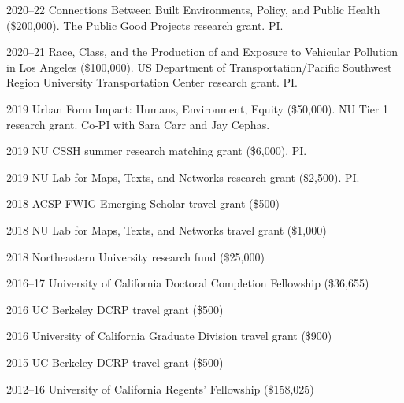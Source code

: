 \documentclass[12pt,letterpaper]{report}
\begin{document}
    \begin{tablist}

        \item[2020--22] \tab Connections Between Built Environments, Policy, and Public Health (\$200,000). The Public Good Projects research grant. PI.

        \item[2020--21] \tab Race, Class, and the Production of and Exposure to Vehicular Pollution in Los Angeles (\$100,000). US Department of Transportation/Pacific Southwest Region University Transportation Center research grant. PI.

        \item[2019] \tab Urban Form Impact: Humans, Environment, Equity (\$50,000). NU Tier 1 research grant. Co-PI with Sara Carr and Jay Cephas.

        \item[2019] \tab NU CSSH summer research matching grant (\$6,000). PI.

        \item[2019] \tab NU Lab for Maps, Texts, and Networks research grant (\$2,500). PI.

        \item[2018] \tab ACSP FWIG Emerging Scholar travel grant (\$500)

        \item[2018] \tab NU Lab for Maps, Texts, and Networks travel grant (\$1,000)

        \item[2018] \tab Northeastern University research fund (\$25,000)

        \item[2016--17] \tab University of California Doctoral Completion Fellowship (\$36,655)

        \item[2016] \tab UC Berkeley DCRP travel grant (\$500)

        \item[2016] \tab University of California Graduate Division travel grant (\$900)

        \item[2015] \tab UC Berkeley DCRP travel grant (\$500)

        \item[2012--16] \tab University of California Regents' Fellowship (\$158,025)

    \end{tablist}
\end{document}
